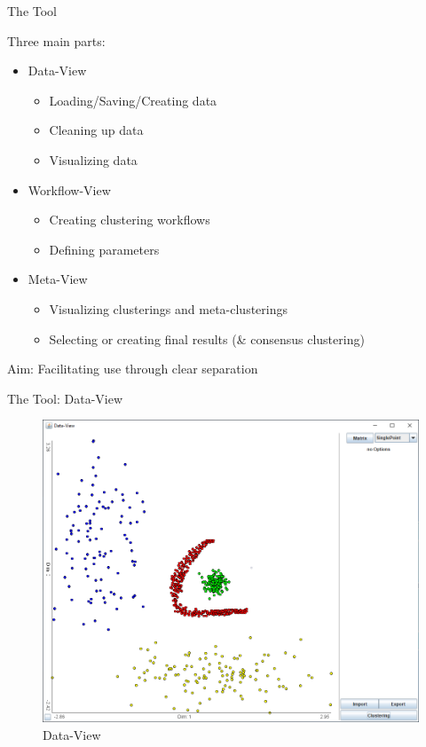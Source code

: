 \documentclass[aspectratio=169]{beamer}
\begin{document}
\begin{frame}{The Tool}
	
	Three main parts:
	\begin{itemize}
		\item Data-View
		\begin{itemize}
			\item Loading/Saving/Creating data
			\item Cleaning up data
			\item Visualizing data
		\end{itemize}
		\item Workflow-View
		\begin{itemize}
			\item Creating clustering workflows
			\item Defining parameters
		\end{itemize}
		\item Meta-View
		\begin{itemize}
			\item Visualizing clusterings and meta-clusterings
			\item Selecting or creating final results (\& consensus clustering)
		\end{itemize}
	\end{itemize}

Aim: Facilitating use through clear separation

\end{frame}

\begin{frame}{The Tool: Data-View}
	
	\begin{figure}
	  \centering
	    \includegraphics[width=.64\textwidth]{unob}
	  \caption{Data-View}
	  \label{fig:data-view}
	\end{figure}

\end{frame}
\end{document}
